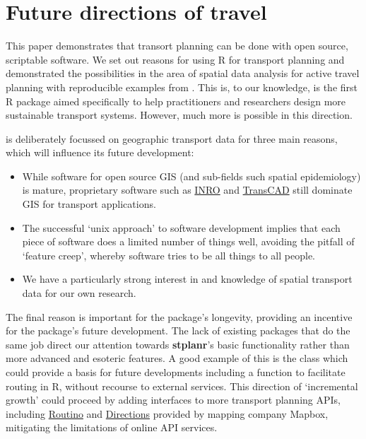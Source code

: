 \section{Future directions of travel}\label{future-directions-of-travel}

This paper demonstrates that transort planning can be done with open source, scriptable software.
We set out reasons for using R for transport planning and demonstrated the possibilities in the area of spatial data analysis for active travel planning with reproducible examples from .
This is, to our knowledge, is the first R package aimed specifically to help practitioners and researchers design more sustainable transport systems.
However, much more is possible in this direction.

 is deliberately focussed on geographic transport data for three main reasons, which will influence its future development:

\begin{itemize}
\tightlist
  \item While software for open source GIS (and sub-fields such spatial epidemiology) is mature,  proprietary software such as \href{https://www.inrosoftware.com/en/products/emme/}{INRO} and  \href{http://www.caliper.com/tcovu.htm}{TransCAD} still dominate GIS for transport applications.
  \item The successful `unix approach' to software development implies that each piece of software does a limited number of things well, avoiding the pitfall of `feature creep', whereby software tries to be all things to all people.
  \item We have a particularly strong interest in and knowledge of spatial transport data for our own research.
\end{itemize}

The final reason is important for the package's longevity, providing an incentive for the package's future development.
The lack of existing packages that do the same job direct our attention towards \textbf{stplanr}'s basic functionality rather than more advanced and esoteric features.
A good example of this is the  class which could provide a basis for future developments including a  function to facilitate routing in R, without recourse to external services.
This direction of `incremental growth' could proceed by adding interfaces to more transport planning APIs, including \href{https://www.routino.org/uk/}{Routino} and \href{https://www.mapbox.com/directions/}{Directions} provided by mapping company Mapbox, mitigating the limitations of online API services.

